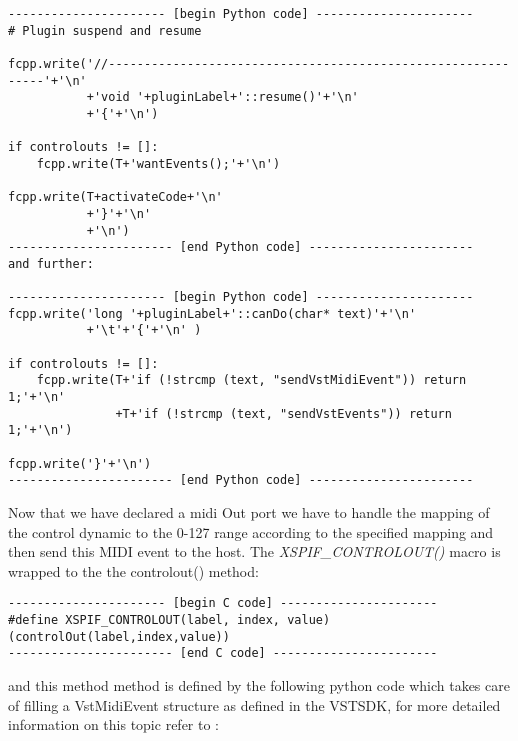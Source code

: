 \begin{verbatim}
---------------------- [begin Python code] ----------------------
# Plugin suspend and resume
    
fcpp.write('//-------------------------------------------------------------'+'\n'
           +'void '+pluginLabel+'::resume()'+'\n'
           +'{'+'\n')
    
if controlouts != []:
    fcpp.write(T+'wantEvents();'+'\n')

fcpp.write(T+activateCode+'\n'
           +'}'+'\n'
           +'\n')
----------------------- [end Python code] -----------------------
and further:

---------------------- [begin Python code] ----------------------
fcpp.write('long '+pluginLabel+'::canDo(char* text)'+'\n'
           +'\t'+'{'+'\n' )

if controlouts != []:
    fcpp.write(T+'if (!strcmp (text, "sendVstMidiEvent")) return 1;'+'\n'
               +T+'if (!strcmp (text, "sendVstEvents")) return 1;'+'\n')

fcpp.write('}'+'\n')
----------------------- [end Python code] -----------------------
\end{verbatim}

\noindent Now that we have declared a midi Out port we have to handle
the mapping of the control dynamic to the 0-127 range according to the
specified mapping and then send this MIDI event to the host. The
\textit{XSPIF\_CONTROLOUT()} macro is wrapped to the the controlout() method:

\begin{verbatim}
---------------------- [begin C code] ----------------------
#define XSPIF_CONTROLOUT(label, index, value)(controlOut(label,index,value))
----------------------- [end C code] -----------------------
\end{verbatim}


and this method method is defined by the following python code which
takes care of filling a VstMidiEvent structure as defined in the
VSTSDK, for more detailed information on this topic refer to \cite{vst:sdk}:

